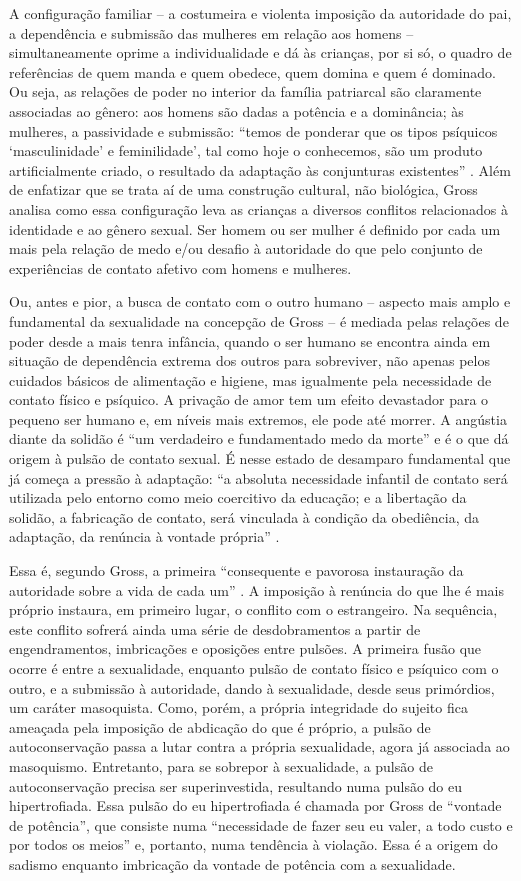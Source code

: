 A configuração familiar -- a costumeira e violenta imposição da
autoridade do pai, a dependência e submissão das mulheres em relação aos
homens -- simultaneamente oprime a individualidade e dá às crianças, por
si só, o quadro de referências de quem manda e quem obedece, quem domina
e quem é dominado. Ou seja, as relações de poder no interior da família
patriarcal são claramente associadas ao gênero: aos homens são dadas a
potência e a dominância; às mulheres, a passividade e submissão: ``temos
de ponderar que os tipos psíquicos `masculinidade' e feminilidade', tal
como hoje o conhecemos, são um produto artificialmente criado, o
resultado da adaptação às conjunturas existentes'' . Além de enfatizar
que se trata aí de uma construção cultural, não biológica, Gross analisa
como essa configuração leva as crianças a diversos conflitos
relacionados à identidade e ao gênero sexual. Ser homem ou ser mulher é
definido por cada um mais pela relação de medo e/ou desafio à autoridade
do que pelo conjunto de experiências de contato afetivo com homens e
mulheres.

Ou, antes e pior, a busca de contato com o outro humano -- aspecto mais
amplo e fundamental da sexualidade na concepção de Gross -- é mediada
pelas relações de poder desde a mais tenra infância, quando o ser humano
se encontra ainda em situação de dependência extrema dos outros para
sobreviver, não apenas pelos cuidados básicos de alimentação e higiene,
mas igualmente pela necessidade de contato físico e psíquico. A privação
de amor tem um efeito devastador para o pequeno ser humano e, em níveis
mais extremos, ele pode até morrer. A angústia diante da solidão é ``um
verdadeiro e fundamentado medo da morte'' e é o que dá origem à pulsão
de contato sexual. É nesse estado de desamparo fundamental que já começa
a pressão à adaptação: ``a absoluta necessidade infantil de contato será
utilizada pelo entorno como meio coercitivo da educação; e a libertação
da solidão, a fabricação de contato, será vinculada à condição da
obediência, da adaptação, da renúncia à vontade própria'' .

Essa é, segundo Gross, a primeira ``consequente e pavorosa instauração
da autoridade sobre a vida de cada um'' . A imposição à renúncia do que
lhe é mais próprio instaura, em primeiro lugar, o conflito com o
estrangeiro. Na sequência, este conflito sofrerá ainda uma série de
desdobramentos a partir de engendramentos, imbricações e oposições entre
pulsões. A primeira fusão que ocorre é entre a sexualidade, enquanto
pulsão de contato físico e psíquico com o outro, e a submissão à
autoridade, dando à sexualidade, desde seus primórdios, um caráter
masoquista. Como, porém, a própria integridade do sujeito fica ameaçada
pela imposição de abdicação do que é próprio, a pulsão de
autoconservação passa a lutar contra a própria sexualidade, agora já
associada ao masoquismo. Entretanto, para se sobrepor à sexualidade, a
pulsão de autoconservação precisa ser superinvestida, resultando numa
pulsão do eu hipertrofiada. Essa pulsão do eu hipertrofiada é chamada
por Gross de ``vontade de potência'', que consiste numa ``necessidade de
fazer seu eu valer, a todo custo e por todos os meios'' e, portanto,
numa tendência à violação. Essa é a origem do sadismo enquanto
imbricação da vontade de potência com a sexualidade.

